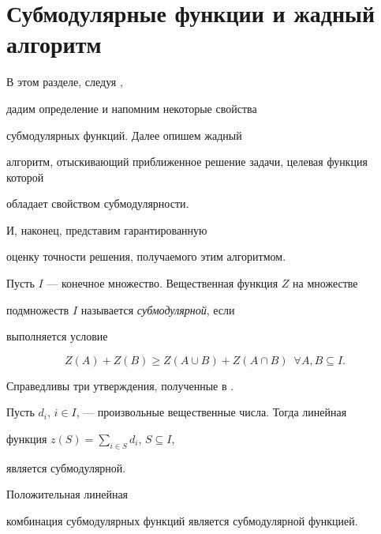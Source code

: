 \section{Субмодулярные функции и жадный алгоритм}





В этом разделе, следуя \cite{NWF78},


дадим определение и напомним некоторые свойства 


субмодулярных функций. Далее опишем жадный 


алгоритм, отыскивающий приближенное решение задачи, целевая функция которой 


обладает свойством субмодулярности.


И, наконец, представим гарантированную 


оценку точности решения, получаемого этим алгоритмом.





\begin{defn}


Пусть $I$ --- конечное множество. Вещественная функция $Z$ на множестве


подмножеств $I$ называется {\it субмодулярной}, если


выполняется условие


$$


Z(A)+Z(B) \ge Z(A \cup B) +Z(A \cap B)\ \; \forall A,B \subseteq I.


$$


\end{defn}





Справедливы три утверждения, полученные в \cite{NWF78}.





\begin{lem} 


\label{c2}


Пусть $d_i$, $i \in I$, --- произвольные вещественные числа. Тогда линейная 


функция $z(S)=\sum\limits_{i \in S}d_i$, $S \subseteq I$,


является субмодулярной.


\end{lem}





\begin{lem} 


\label{c3}


Положительная линейная


комбинация субмодулярных функций является субмодулярной функцией.


\end{lem}






